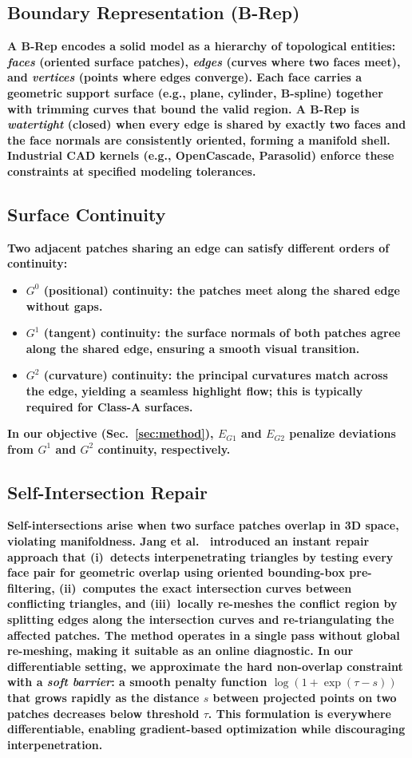 \documentclass{ieeeaccess}
\providecommand{\DIFaddtex}[1]{{\color{blue}\bfseries #1}} %
\providecommand{\DIFadd}[1]{\texorpdfstring{\DIFaddtex{#1}}{#1}} %
\begin{document}
\subsection{\DIFadd{Boundary Representation (B-Rep)}}
\DIFadd{A B-Rep encodes a solid model as a hierarchy of topological entities:
\emph{faces} (oriented surface patches), \emph{edges} (curves where two faces meet),
and \emph{vertices} (points where edges converge).
Each face carries a geometric support surface (e.g., plane, cylinder, B-spline)
together with trimming curves that bound the valid region.
A B-Rep is \emph{watertight} (closed) when every edge is shared by exactly two faces
and the face normals are consistently oriented, forming a manifold shell.
Industrial CAD kernels (e.g., OpenCascade, Parasolid) enforce these
constraints at specified modeling tolerances.
}

\subsection{\DIFadd{Surface Continuity}}
\DIFadd{Two adjacent patches sharing an edge can satisfy different orders of continuity:
}\begin{itemize}
  \item \DIFadd{\textbf{$G^0$ (positional) continuity:} the patches meet along the shared edge without gaps.
  }\item \DIFadd{\textbf{$G^1$ (tangent) continuity:} the surface normals of both patches agree along the shared edge, ensuring a smooth visual transition.
  }\item \DIFadd{\textbf{$G^2$ (curvature) continuity:} the principal curvatures match across the edge, yielding a seamless highlight flow; this is typically required for Class-A surfaces.
}\end{itemize}
\DIFadd{In our objective (Sec.~\ref{sec:method}), $E_{G1}$ and $E_{G2}$ penalize deviations from $G^1$ and $G^2$ continuity, respectively.
}

\subsection{\DIFadd{Self-Intersection Repair}}
\DIFadd{Self-intersections arise when two surface patches overlap in 3D space, violating manifoldness.
Jang et al.~\cite{b12} introduced an instant repair approach that
(i)~detects interpenetrating triangles by testing every face pair for
geometric overlap using oriented bounding-box pre-filtering,
(ii)~computes the exact intersection curves between conflicting
triangles, and (iii)~locally re-meshes the conflict region by splitting
edges along the intersection curves and re-triangulating the affected
patches. The method operates in a single pass without global re-meshing,
making it suitable as an online diagnostic.
In our differentiable setting, we approximate the hard non-overlap constraint with a
\emph{soft barrier}: a smooth penalty function
$\log(1+\exp(\tau-s))$ that grows rapidly as the distance $s$ between projected
points on two patches decreases below threshold $\tau$.
This formulation is everywhere differentiable, enabling gradient-based
optimization while discouraging interpenetration.
}
\end{document}
